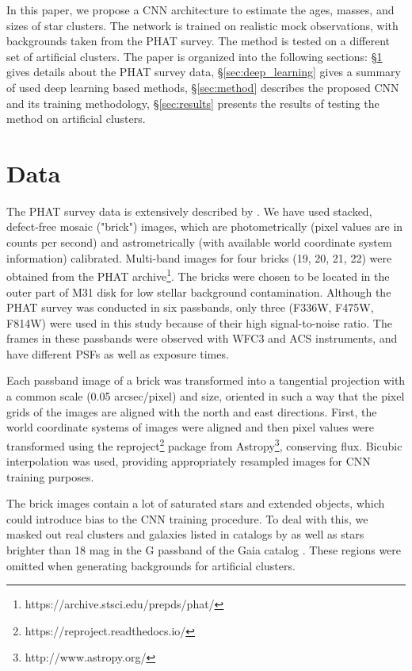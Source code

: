 \documentclass{aa}
\begin{document}
In this paper, we propose a CNN architecture to estimate the ages, masses, and sizes of star clusters. The network is trained on realistic mock observations, with backgrounds taken from the PHAT survey. The method is tested on a different set of artificial clusters. The paper is organized into the following sections: \S \ref{sec:data} gives details about the PHAT survey data, \S \ref{sec:deep_learning} gives a summary of used deep learning based methods, \S \ref{sec:method} describes the proposed CNN and its training methodology, \S \ref{sec:results} presents the results of testing the method on artificial clusters.

\section{Data} \label{sec:data}
The PHAT survey data is extensively described by \cite{2012ApJS..200...18D}. We have used stacked, defect-free mosaic ("brick") images, which are photometrically (pixel values are in counts per second) and astrometrically (with available world coordinate system information) calibrated. Multi-band images for four bricks (19, 20, 21, 22) were obtained from the PHAT archive\footnote{https://archive.stsci.edu/prepds/phat/}. The bricks were chosen to be located in the outer part of M31 disk for low stellar background contamination. Although the PHAT survey was conducted in six passbands, only three (F336W, F475W, F814W) were used in this study because of their high signal-to-noise ratio. The frames in these passbands were observed with WFC3 and ACS instruments, and have different PSFs as well as exposure times.

Each passband image of a brick was transformed into a tangential projection with a common scale (0.05 arcsec/pixel) and size, oriented in such a way that the pixel grids of the images are aligned with the north and east directions. First, the world coordinate systems of images were aligned and then pixel values were transformed using the reproject\footnote{https://reproject.readthedocs.io/} package from Astropy\footnote{http://www.astropy.org/}, conserving flux. Bicubic interpolation was used, providing appropriately resampled images for CNN training purposes.

The brick images contain a lot of saturated stars and extended objects, which could introduce bias to the CNN training procedure. To deal with this, we masked out real clusters and galaxies listed in catalogs by \cite{2012ApJ...752...95J, 2015ApJ...802..127J} as well as stars brighter than 18 mag in the G passband of the Gaia catalog \citep{2016A&A...595A...2G}. These regions were omitted when generating backgrounds for artificial clusters.
\end{document}
